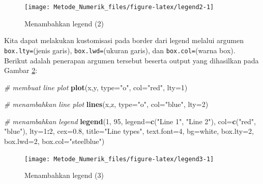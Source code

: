 \documentclass[
]{book}
\newenvironment{Shaded}{\begin{snugshade}}{\end{snugshade}}
\newcommand{\AttributeTok}[1]{\textcolor[rgb]{0.13,0.29,0.53}{#1}}
\newcommand{\CommentTok}[1]{\textcolor[rgb]{0.56,0.35,0.01}{\textit{#1}}}
\newcommand{\DecValTok}[1]{\textcolor[rgb]{0.00,0.00,0.81}{#1}}
\newcommand{\FloatTok}[1]{\textcolor[rgb]{0.00,0.00,0.81}{#1}}
\newcommand{\FunctionTok}[1]{\textcolor[rgb]{0.13,0.29,0.53}{\textbf{#1}}}
\newcommand{\NormalTok}[1]{#1}
\newcommand{\SpecialCharTok}[1]{\textcolor[rgb]{0.81,0.36,0.00}{\textbf{#1}}}
\newcommand{\StringTok}[1]{\textcolor[rgb]{0.31,0.60,0.02}{#1}}
\theoremstyle{definition}
\theoremstyle{definition}
\theoremstyle{definition}
\theoremstyle{definition}
\theoremstyle{remark}
\begin{document}
\begin{figure}

{\centering \texttt{[image: Metode\_Numerik\_files/figure-latex/legend2-1]} 

}

\caption{Menambahkan legend (2)}\label{fig:legend2}
\end{figure}

Kita dapat melakukan kustomisasi pada border dari legend melalui argumen \texttt{box.lty=}(jenis garis), \texttt{box.lwd=}(ukuran garis), dan \texttt{box.col=}(warna box). Berikut adalah penerapan argumen tersebut beserta output yang dihasilkan pada Gambar \ref{fig:legend3}:

\begin{Shaded}
\begin{Highlighting}[]
\CommentTok{\# membuat line plot}
\FunctionTok{plot}\NormalTok{(x,y, }\AttributeTok{type=}\StringTok{"o"}\NormalTok{, }\AttributeTok{col=}\StringTok{"red"}\NormalTok{, }\AttributeTok{lty=}\DecValTok{1}\NormalTok{)}

\CommentTok{\# menambahkan line plot}
\FunctionTok{lines}\NormalTok{(x,z, }\AttributeTok{type=}\StringTok{"o"}\NormalTok{, }\AttributeTok{col=}\StringTok{"blue"}\NormalTok{, }\AttributeTok{lty=}\DecValTok{2}\NormalTok{)}

\CommentTok{\# menambahkan legend}
\FunctionTok{legend}\NormalTok{(}\DecValTok{1}\NormalTok{, }\DecValTok{95}\NormalTok{, }\AttributeTok{legend=}\FunctionTok{c}\NormalTok{(}\StringTok{"Line 1"}\NormalTok{, }\StringTok{"Line 2"}\NormalTok{),}
       \AttributeTok{col=}\FunctionTok{c}\NormalTok{(}\StringTok{"red"}\NormalTok{, }\StringTok{"blue"}\NormalTok{), }\AttributeTok{lty=}\DecValTok{1}\SpecialCharTok{:}\DecValTok{2}\NormalTok{, }\AttributeTok{cex=}\FloatTok{0.8}\NormalTok{,}
       \AttributeTok{title=}\StringTok{"Line types"}\NormalTok{, }\AttributeTok{text.font=}\DecValTok{4}\NormalTok{, }\AttributeTok{bg=}\StringTok{\textquotesingle{}white\textquotesingle{}}\NormalTok{,}
       \AttributeTok{box.lty=}\DecValTok{2}\NormalTok{, }\AttributeTok{box.lwd=}\DecValTok{2}\NormalTok{, }\AttributeTok{box.col=}\StringTok{"steelblue"}\NormalTok{)}
\end{Highlighting}
\end{Shaded}

\begin{figure}

{\centering \texttt{[image: Metode\_Numerik\_files/figure-latex/legend3-1]} 

}

\caption{Menambahkan legend (3)}\label{fig:legend3}
\end{figure}
\end{document}
